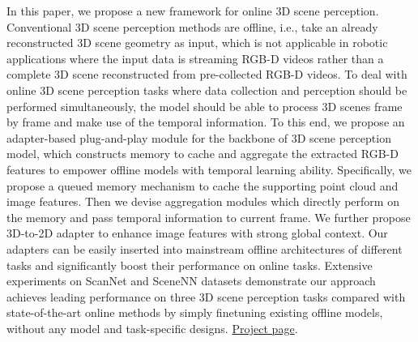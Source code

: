 In this paper, we propose a new framework for online 3D scene perception. 
Conventional 3D scene perception methods are offline, i.e., take an already reconstructed 3D scene geometry as input, which is not applicable in robotic applications where the input data is streaming RGB-D videos rather than a complete 3D scene reconstructed from pre-collected RGB-D videos.
To deal with online 3D scene perception tasks where data collection and perception should be performed simultaneously, the model should be able to process 3D scenes frame by frame and make use of the temporal information.
To this end, we propose an adapter-based plug-and-play module for the backbone of 3D scene perception model, which constructs memory to cache and aggregate the extracted RGB-D features to empower offline models with temporal learning ability. Specifically, we propose a queued memory mechanism to cache the supporting point cloud and image features. Then we devise aggregation modules which directly perform on the memory and pass temporal information to current frame. We further propose 3D-to-2D adapter to enhance image features with strong global context. 
Our adapters can be easily inserted into mainstream offline architectures of different tasks and significantly boost their performance on online tasks. 
Extensive experiments on ScanNet and SceneNN datasets demonstrate our approach achieves leading performance on three 3D scene perception tasks compared with state-of-the-art online methods by simply finetuning existing offline models, without any model and task-specific designs.
\href{https://xuxw98.github.io/Online3D/}{Project page}.